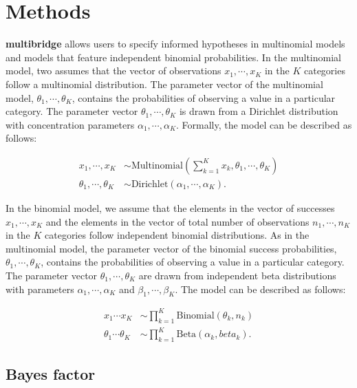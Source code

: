 \documentclass[
  english,
  man,floatsintext]{apa6}
\begin{document}
\hypertarget{methods}{%
\section{Methods}\label{methods}}

\textbf{multibridge} allows users to specify informed hypotheses in multinomial models and models that feature independent binomial probabilities. In the multinomial model, two assumes that the vector of observations \(x_1, \cdots, x_K\) in the \(K\) categories follow a multinomial distribution. The parameter vector of the multinomial model, \(\theta_1, \cdots, \theta_K\), contains the probabilities of observing a value in a particular category. The parameter vector \(\theta_1, \cdots, \theta_K\) is drawn from a Dirichlet distribution with concentration parameters \(\alpha_1, \cdots, \alpha_K\). Formally, the model can be described as follows:

\begin{align}
  x_1, \cdots, x_K &\sim \text{Multinomial}(\sum_{k = 1}^K x_k, \theta_1, \cdots, \theta_K) \\
  \theta_1, \cdots, \theta_K &\sim \text{Dirichlet}(\alpha_1, \cdots, \alpha_K).
\end{align}

In the binomial model, we assume that the elements in the vector of successes \(x_1, \cdots, x_K\) and the elements in the vector of total number of observations \(n_1, \cdots, n_K\) in the \(K\) categories follow independent binomial distributions. As in the multinomial model, the parameter vector of the binomial success probabilities, \(\theta_1, \cdots, \theta_K\), contains the probabilities of observing a value in a particular category. The parameter vector \(\theta_1, \cdots, \theta_K\) are drawn from independent beta distributions with parameters \(\alpha_1, \cdots, \alpha_K\) and \(\beta_1, \cdots, \beta_K\). The model can be described as follows:

\begin{align}
  x_1 \cdots x_K & \sim \prod_{k = 1}^K \text{Binomial}(\theta_k, n_k) \\
  \theta_1 \cdots \theta_K &\sim \prod_{k = 1}^K \text{Beta}(\alpha_k, beta_k).
\end{align}

\hypertarget{bayes-factor}{%
\subsection{Bayes factor}\label{bayes-factor}}
\end{document}
